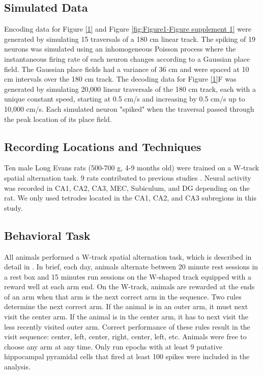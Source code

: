 \documentclass[times, twoside]{zHenriquesLab-StyleBioRxiv}
\begin{document}
\subsection*{Simulated Data}
Encoding data for Figure \ref{1} and Figure \ref{fig:Figure1-Figure supplement 1} were generated by simulating 15 traversals of a 180 cm linear track. The spiking of 19 neurons was simulated using an inhomogeneous Poisson process where the instantaneous firing rate of each neuron changes according to a Gaussian place field. The Gaussian place fields had a variance of 36 cm and were spaced at 10 cm intervals over the 180 cm track. The decoding data for Figure \ref{1}F was generated by simulating 20,000 linear traversals of the 180 cm track, each with a unique constant speed, starting at 0.5 cm/s and increasing by 0.5 cm/s up to 10,000 cm/s. Each simulated neuron "spiked" when the traversal passed through the peak location of its place field.

\subsection*{Recording Locations and Techniques}
Ten male Long Evans rats (500-700 g, 4-9 months old) were trained on a W-track spatial alternation task. 9 rats contributed to previous studies \cite{KarlssonAwakereplayremote2009, KayConstantSubsecondCycling2020, Kayhippocampalnetworkspatial2016, CarrTransientSlowGamma2012}. Neural activity was recorded in CA1, CA2, CA3, MEC, Subiculum, and DG depending on the rat. We only used tetrodes located in the CA1, CA2, and CA3 subregions in this study.

\subsection*{Behavioral Task}
All animals performed a W-track spatial alternation task, which is described in detail in \cite{KarlssonAwakereplayremote2009}. In brief, each day, animals alternate between 20 minute rest sessions in a rest box and 15 minutes run sessions on the W-shaped track equipped with a reward well at each arm end. On the W-track, animals are rewarded at the ends of an arm when that arm is the next correct arm in the sequence. Two rules determine the next correct arm. If the animal is in an outer arm, it must next visit the center arm. If the animal is in the center arm, it has to next visit the less recently visited outer arm. Correct performance of these rules result in the visit sequence: center, left, center, right, center, left, etc. Animals were free to choose any arm at any time. Only run epochs with at least 9 putative hippocampal pyramidal cells that fired at least 100 spikes were included in the analysis.
\end{document}
